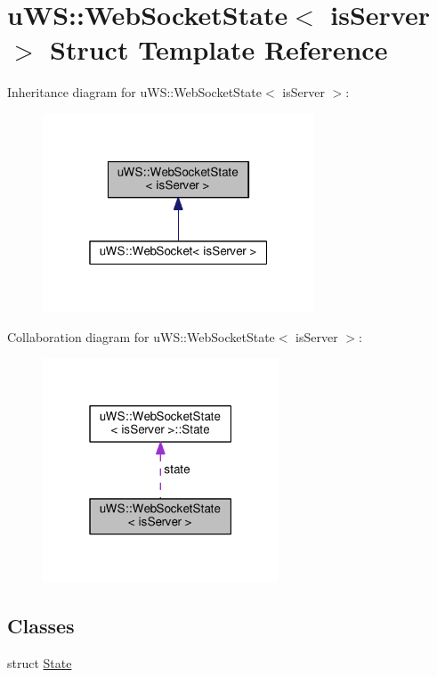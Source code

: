 \hypertarget{structu_w_s_1_1_web_socket_state}{}\section{u\+WS\+:\+:Web\+Socket\+State$<$ is\+Server $>$ Struct Template Reference}
\label{structu_w_s_1_1_web_socket_state}


Inheritance diagram for u\+WS\+:\+:Web\+Socket\+State$<$ is\+Server $>$\+:
\nopagebreak
\begin{figure}[H]
\begin{center}
\leavevmode
\includegraphics[width=229pt]{structu_w_s_1_1_web_socket_state__inherit__graph}
\end{center}
\end{figure}


Collaboration diagram for u\+WS\+:\+:Web\+Socket\+State$<$ is\+Server $>$\+:
\nopagebreak
\begin{figure}[H]
\begin{center}
\leavevmode
\includegraphics[width=199pt]{structu_w_s_1_1_web_socket_state__coll__graph}
\end{center}
\end{figure}
\subsection*{Classes}
\begin{DoxyCompactItemize}
\item 
struct \mbox{\hyperlink{structu_w_s_1_1_web_socket_state_1_1_state}{State}}
\end{DoxyCompactItemize}
